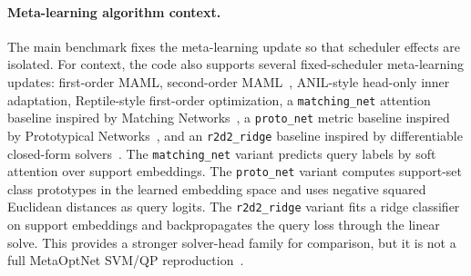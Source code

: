 \paragraph{Meta-learning algorithm context.}
The main benchmark fixes the meta-learning update so that scheduler effects are isolated.
For context, the code also supports several fixed-scheduler meta-learning updates: first-order MAML, second-order MAML~\cite{finn2017maml}, ANIL-style head-only inner adaptation, Reptile-style first-order optimization, a \texttt{matching\_net} attention baseline inspired by Matching Networks~\cite{vinyals2016matching}, a \texttt{proto\_net} metric baseline inspired by Prototypical Networks~\cite{snell2017prototypical}, and an \texttt{r2d2\_ridge} baseline inspired by differentiable closed-form solvers~\cite{bertinetto2019meta}.
The \texttt{matching\_net} variant predicts query labels by soft attention over support embeddings.
The \texttt{proto\_net} variant computes support-set class prototypes in the learned embedding space and uses negative squared Euclidean distances as query logits.
The \texttt{r2d2\_ridge} variant fits a ridge classifier on support embeddings and backpropagates the query loss through the linear solve.
This provides a stronger solver-head family for comparison, but it is not a full MetaOptNet SVM/QP reproduction~\cite{lee2019metaoptnet}.

